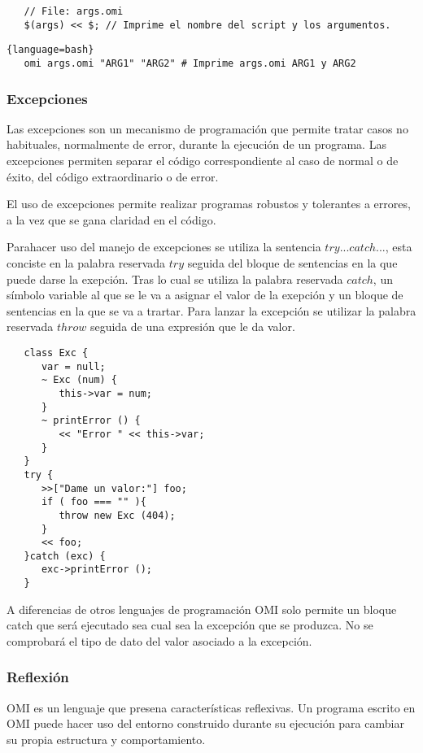  \begin{lstlisting}
   // File: args.omi
   $(args) << $; // Imprime el nombre del script y los argumentos.
\end{lstlisting}

 \begin{lstlisting}{language=bash}
   omi args.omi "ARG1" "ARG2" # Imprime args.omi ARG1 y ARG2
\end{lstlisting}

\subsubsection{Excepciones} \label{sec:exception}

Las excepciones son un mecanismo de programación que permite tratar casos no habituales, normalmente de error, durante la ejecución de un programa. Las excepciones
permiten separar el código correspondiente al caso de normal o de éxito, del código extraordinario o de error. 

El uso de excepciones permite realizar programas robustos y tolerantes a errores, a la vez que se gana claridad en el código.

Parahacer uso del manejo de excepciones se utiliza la sentencia $try...catch...$, esta conciste en la palabra reservada $try$ seguida del bloque de 
sentencias en la que puede darse la exepción. Tras lo cual se utiliza la palabra reservada $catch$, un símbolo variable al que se le va a asignar el valor de la exepción y un bloque de 
sentencias en la que se va a trartar. Para lanzar la excepción se utilizar la palabra reservada $throw$ seguida de una expresión que le da valor. \\

\begin{lstlisting}
   class Exc {
      var = null;
      ~ Exc (num) {
         this->var = num;
      }
      ~ printError () {
         << "Error " << this->var;
      }
   }
   try {
      >>["Dame un valor:"] foo;
      if ( foo === "" ){
         throw new Exc (404);
      } 
      << foo;
   }catch (exc) {
      exc->printError ();
   }
\end{lstlisting}

A diferencias de otros lenguajes de programación OMI solo permite un bloque catch que será ejecutado sea cual sea la excepción que se produzca. No se comprobará el 
tipo de dato del valor asociado a la excepción. 

\subsubsection{Reflexión}
OMI es un lenguaje que presena características reflexivas. Un programa escrito en OMI puede hacer uso del entorno construido durante su ejecución para cambiar su propia estructura
y comportamiento.

